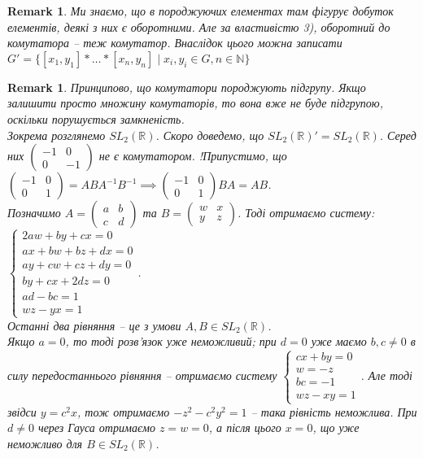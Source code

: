 \documentclass[a4paper, 10pt]{article}
\theoremstyle{theoremdd}
\theoremstyle{theoremdd}
\theoremstyle{theoremdd}
\theoremstyle{theoremdd}
\theoremstyle{theoremdd}
\theoremstyle{theoremdd}
\theoremstyle{theoremdd}
\theoremstyle{theoremdd}
\theoremstyle{theoremdd}
\theoremstyle{theoremdd}
\theoremstyle{theoremdd}
\newtheorem{remark}[theorem]{Remark}
\theoremstyle{theoremdd}
\theoremstyle{theoremdd}
\theoremstyle{theoremdd}
\theoremstyle{theoremdd}
\begin{document}
\begin{remark}
Ми знаємо, що в породжуючих елементах там фігурує добуток елементів, деякі з них є оборотними. Але за властивістю 3), оборотний до комутатора -- теж комутатор. Внаслідок цього можна записати\\
$G' = \{ [x_1,y_1]*\dots*[x_n,y_n] \mid x_i,y_i \in G, n \in \mathbb{N} \}$
\end{remark}

\begin{remark}
Принципово, що комутатори породжують підгрупу. Якщо залишити просто множину комутаторів, то вона вже не буде підгрупою, оскільки порушується замкненість.\\
Зокрема розглянемо $SL_2(\mathbb{R})$. Скоро доведемо, що $SL_2(\mathbb{R})' = SL_2(\mathbb{R})$. Серед них $\begin{pmatrix}
-1 & 0 \\
0 & -1
\end{pmatrix}$ не є комутатором.
\iffalse
!Припустимо, що $\begin{pmatrix}
-1 & 0 \\
0 & 1
\end{pmatrix} = ABA^{-1}B^{-1} \implies \begin{pmatrix}
-1 & 0 \\
0 & 1
\end{pmatrix} BA = AB$.\\
Позначимо $A = \begin{pmatrix}
a & b \\
c & d
\end{pmatrix}$ та $B = \begin{pmatrix}
w & x \\
y & z
\end{pmatrix}$. Тоді отримаємо систему:\\
$\begin{cases} 
2aw + by + cx = 0 \\
ax + bw + bz + dx = 0 \\
ay + cw + cz + dy = 0 \\
by + cx + 2dz = 0 \\
ad - bc = 1 \\
wz - yx = 1
\end{cases}$.\\
Останні два рівняння -- це з умови $A,B \in SL_2(\mathbb{R})$.\\
Якщо $a = 0$, то тоді розв'язок уже неможливий; при $d = 0$ уже маємо $b,c \neq 0$ в силу передостаннього рівняння -- отримаємо систему $\begin{cases} cx + by = 0 \\ w = -z \\ bc = -1 \\ wz - xy = 1 \end{cases}$. Але тоді звідси $y = c^2 x$, тож отримаємо $-z^2 - c^2y^2 = 1$ -- така рівність неможлива. При $d \neq 0$ через Гауса отримаємо $z = w = 0$, а після цього $x = 0$, що уже неможливо для $B \in SL_2(\mathbb{R})$.\\

\end{remark}
\end{document}

